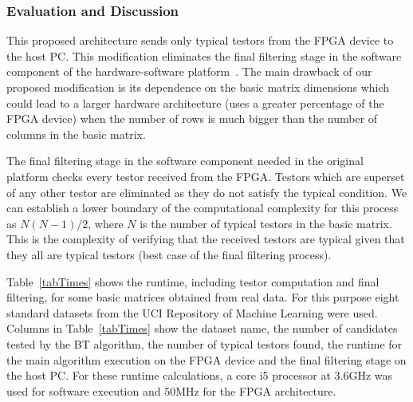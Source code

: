 \documentclass[authoryear,11pt]{elsarticle}
\begin{document}
\subsubsection{Evaluation and Discussion}
	This proposed architecture sends only typical testors from the FPGA device to the 
	host PC. This modification eliminates the final filtering stage in the software component of the 
	hardware-software platform~\citep{Rojas12}. The main drawback of our proposed modification is its 
	dependence on the basic matrix dimensions which could lead to a larger hardware architecture (uses a greater
	percentage of the FPGA device) when the number of rows is much bigger than the number of columns in the basic 
	matrix. 
	
	The final filtering stage in the software component needed in the original platform \citep{Rojas12} checks 
	every testor received from the FPGA. Testors which are superset of any other testor are 
	eliminated as they do not satisfy the typical condition. We 
	can establish a lower boundary of the computational complexity for this process as $N(N-1)/2$, 
	where $N$ is the number of typical testors in the basic matrix. This is the complexity of verifying that
	the received testors are typical given that they all are typical testors (best case of the final filtering 
	process).
	
	Table~\ref{tabTimes} shows the runtime, including testor computation and final filtering, 
	for some basic matrices obtained from real data. For this purpose eight standard datasets from the UCI
	Repository of Machine Learning \citep{Bache13} were used.
	Columns in Table~\ref{tabTimes} show the dataset name, the number of candidates tested by the BT algorithm,
	the number of typical testors found, the runtime for the main algorithm execution on the 
	FPGA device and the final filtering stage on the host PC. For these runtime calculations, 
	a core i5 processor at 3.6GHz was used for software execution and 50MHz for the FPGA architecture.
	
\end{document}

